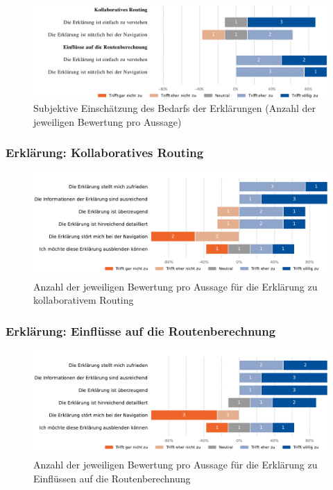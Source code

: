 \begin{figure}[htb!]
    \centering
    \includegraphics[width=\textwidth]{contents/06_model_evaluation/02_evaluation/res/qualitativeFeedback-evaluation_usefulness_qualitative.pdf}
    \caption{Subjektive Einschätzung des Bedarfs der Erklärungen (Anzahl der jeweiligen Bewertung pro Aussage)}
    \label{fig:evaluation_usefulness_qualitative}
\end{figure}

\newpage

\subsubsection{Erklärung: Kollaboratives Routing}

\begin{figure}[htb!]
    \centering
    \includegraphics[width=\textwidth]{contents/06_model_evaluation/02_evaluation/res/qualitativeFeedback-01_collaborative_routing_short.pdf}
    \caption{Anzahl der jeweiligen Bewertung pro Aussage für die Erklärung zu kollaborativem Routing}
    \label{fig:01_collaborative_routing_short}
\end{figure}

\subsubsection{Erklärung: Einflüsse auf die Routenberechnung}

\begin{figure}[htb!]
    \centering
    \includegraphics[width=\textwidth]{contents/06_model_evaluation/02_evaluation/res/qualitativeFeedback-02_collaborative_algorithm_short.pdf}
    \caption{Anzahl der jeweiligen Bewertung pro Aussage für die Erklärung zu Einflüssen auf die Routenberechnung}
    \label{fig:02_collaborative_algorithm_short}
\end{figure}


